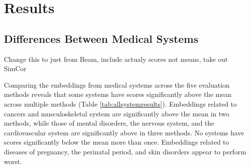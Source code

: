 \documentclass[11pt,a4paper]{article}
\def\red#1{{\color{red}#1}}
\begin{document}
\section{Results}

\subsection{Differences Between Medical Systems}

\red{Change this to just from Beam, include actualy scores not means, take out SimCor}

Comparing the embeddings from medical systems across the five evaluation methods reveals that some systems have scores significantly above the mean across multiple methods (Table \ref{tab:allsystemresults}). Embeddings related to cancers and musculoskeletal system are significantly above the mean in two methods, while those of mental disorders, the nervous system, and the cardiovascular system are significantly above in three methods. No systems have scores significantly below the mean more than once. Embeddings related to diseases of pregnancy, the perinatal period, and skin disorders appear to perform worst.  
\end{document}
